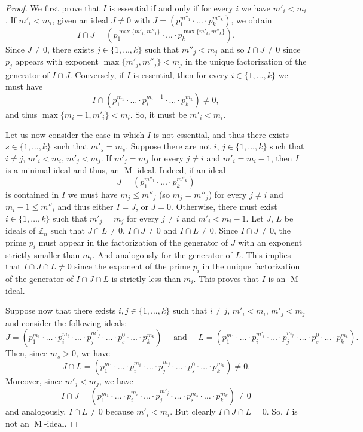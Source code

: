 \documentclass[11pt,leqno]{amsart}
\DeclareMathOperator{\m}{M}
\theoremstyle{definition}
\theoremstyle{remark}
\numberwithin{equation}{section}
\numberwithin{equation}{section}
\begin{document}
\begin{proof}  
We first prove that $I$ is essential if and only if for every $i$ we have $m'_i < m_i$.
If $m'_i < m_i$, given an ideal $J\neq 0$ with $J=(p_1^{m''_1}\cdot \ldots \cdot p_k^{m''_k})$, we obtain 
$$I \cap J= \left(p_1^{\operatorname{max}\{m'_1,m''_1\}}\cdot \ldots \cdot p_k^{\operatorname{max}\{m'_k,m''_k\}}\right).$$
Since $J\neq 0$, there exists $j\in \{1,\ldots, k\}$ such that $m''_j < m_j$ and so $I\cap J\neq 0$ since $p_j$ appears with exponent $\operatorname{max}\{m'_j,m''_j\}< m_j$ in the unique factorization of the generator of $I \cap J$. Conversely, if $I$ is essential, then for every $i\in\{1,\ldots, k\}$ we must have $$I \cap \left(p_1^{m_1}\cdot \ldots \cdot p_i^{m_i-1} \cdot \ldots \cdot p_k^{m_k}\right) \neq 0,$$ and thus $\operatorname{max}\{m_i-1, m'_i\} < m_i$. So, it must be $m'_i < m_i$. 

Let us now consider the case in which $I$ is not essential, and thus there exists $s\in \{1,\ldots,k\}$ such that $m'_s=m_s$. Suppose there are not $i$, $j\in \{1,\ldots, k\}$ such that $i\neq j$, $m'_i < m_i$, $m'_j < m_j$. 
If $m'_j=m_j$ for every $j\neq i$ and $m'_i=m_i -1$, then $I$ is a minimal ideal and thus, an $\m$-ideal. Indeed, if an ideal \[J=\left(p_1^{m''_1}\cdot \ldots \cdot p_k^{m''_k}\right)\] is  contained in $I$ we must have $m_j \leqslant m''_j$ (so $m_j = m''_j$) for every $j\neq i$ and $m_i-1 \leqslant m''_i$ and thus either $I=J$, or $J=0$. Otherwise, there must exist $i\in \{1, \ldots, k\}$ such that $m'_j=m_j$ for every $j\neq i$ and $m'_i < m_i-1$. Let $J$, $L$ be ideals of $\mathds{Z}_n$ such that $J\cap L \neq 0$, $I \cap J \neq 0$ and $I \cap L \neq 0$. Since $I \cap J \neq 0$, the prime $p_i$ must appear in the factorization of the generator of $J$ with an exponent strictly smaller than $m_i$. And analogously for the generator of $L$. This implies that $I \cap J\cap L \neq 0$ since the exponent of the prime $p_i$ in the unique factorization of the generator of $I \cap J\cap L$ is strictly less than $m_i$. This proves that $I$ is an $\m$-ideal. 

Suppose now that there exists $i,j\in \{1,\ldots, k\}$ such that $i\neq j$, $m'_i < m_i$, $m'_j < m_j$ and consider the following ideals: 
$$J=\left(p_1^{m_1}\cdot \ldots \cdot p_i^{m_i} \cdot \ldots \cdot p_j^{m'_j} \cdot \ldots \cdot p^0_s\cdot \ldots \cdot p_k^{m_k}\right) \quad \text{ and } \quad L=\left(p_1^{m_1}\cdot \ldots \cdot p_i^{m'_i} \cdot \ldots \cdot p_j^{m_j} \cdot \ldots \cdot p^0_s\cdot \ldots \cdot p_k^{m_k}\right).$$
Then, since $m_s>0$, we have 
$$J\cap L=\left(p_1^{m_1}\cdot \ldots \cdot p_i^{m_i} \cdot \ldots \cdot p_j^{m_j} \cdot \ldots \cdot p^0_s\cdot \ldots \cdot p_k^{m_k}\right) \neq 0.$$
Moreover, since $m'_j < m_j$, we have $$I \cap J=\left(p_1^{m_1}\cdot \ldots \cdot p_i^{m_i} \cdot \ldots \cdot p_j^{m'_j} \cdot \ldots \cdot p_s^{m_s}\cdot \ldots \cdot p_k^{m_k}\right)\neq 0$$  and analogously, $I \cap L\neq 0$ because $m'_i < m_i$. But clearly $I\cap J\cap L=0$. So, $I$ is not an $\m$-ideal.
\end{proof}
\end{document}

